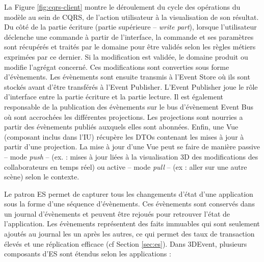 La Figure \ref{fig:cqrs-client} montre le déroulement du cycle des opérations du 
modèle au sein de \gls{CQRS}, de l'action utilisateur à la visualisation de son 
résultat. 
Du côté de la partie écriture (partie supérieure -- \textit{write part}), lorsque 
l'utilisateur déclenche une commande à partir de l'interface, la commande et ses 
paramètres sont récupérés et traités par le domaine pour être validés selon les 
règles métiers exprimées par ce dernier. Si la modification est validée, le domaine 
produit ou modifie l'agrégat concerné. Ces modifications sont converties sous 
forme d'évènements. Les évènements sont ensuite transmis à l'Event Store où ils sont stockés 
avant d'être transférés à l'Event Publisher. L'Event Publisher joue le rôle d'interface 
entre la partie écriture et la partie lecture. Il est également responsable de la 
publication des évènements sur le bus d'évènement Event Bus où sont 
accrochées les différentes projections. Les projections sont nourries a partir des 
évènements publiés auxquels elles sont abonnées. Enfin, une Vue (composant
inclus dans l'\gls{IU}) récupère les \glspl{DTO}
contenant les mises à jour à partir d'une projection. La mise à jour d'une Vue peut 
se faire de manière passive -- mode \textit{push} -- (ex. : mises à jour liées à la 
visualisation 3D des modifications des collaborateurs en temps réel) ou active -- 
mode \textit{pull} -- (ex : aller sur une autre scène) selon le contexte.


Le patron \gls{ES} permet de capturer tous les changements d'état 
d'une application sous la forme d'une séquence d'évènements. 
Ces évènements sont conservés dans un journal d'évènements et peuvent être 
rejoués pour retrouver l'état de l'application. 
Les évènements représentent des faits immuables qui sont 
seulement ajoutés au journal les un après les autres, ce qui permet des taux de 
transaction élevés et une réplication efficace (cf Section 
\ref{sec:es}). Dans 3DEvent, plusieurs composants d'\gls{ES} sont étendus selon 
les applications :

